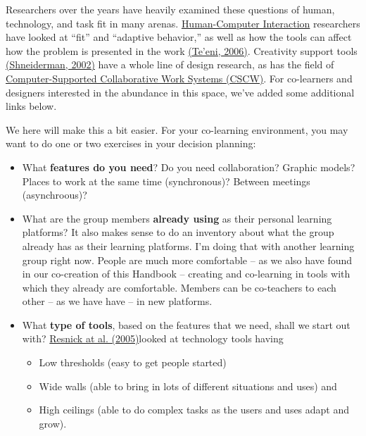 Researchers over the years have heavily examined these questions of
human, technology, and task fit in many arenas.
\href{http://en.wikipedia.org/wiki/Human-Computer\_Interaction}{Human-Computer
Interaction} researchers have looked at ``fit'' and ``adaptive
behavior,'' as well as how the tools can affect how the problem is
presented in the work \hyperref[teeni]{(Te'eni, 2006)}. Creativity
support tools \hyperref[shneiderman]{(Shneiderman, 2002)} have a whole
line of design research, as has the field of
\href{http://en.wikipedia.org/wiki/Computer-supported\_cooperative\_work}{Computer-Supported
Collaborative Work Systems (CSCW)}. For co-learners and designers
interested in the abundance in this space, we've added some additional
links below.

We here will make this a bit easier. For your co-learning environment,
you may want to do one or two exercises in your decision planning:

\begin{itemize}
\item
  What \textbf{features do you need}? Do you need collaboration? Graphic
  models? Places to work at the same time (synchronous)? Between
  meetings (asynchroous)?
\item
  What are the group members \textbf{already using} as their personal
  learning platforms? It also makes sense to do an inventory about what
  the group already has as their learning platforms. I'm doing that with
  another learning group right now. People are much more comfortable --
  as we also have found in our co-creation of this Handbook -- creating
  and co-learning in tools with which they already are comfortable.
  Members can be co-teachers to each other -- as we have have -- in new
  platforms.
\item
  What \textbf{type of tools}, based on the features that we need, shall
  we start out with? \hyperref[resnick]{Resnick at al. (2005)}looked at
  technology tools having

  \begin{itemize}
  \item
    Low thresholds (easy to get people started)
  \item
    Wide walls (able to bring in lots of different situations and uses)
    and
  \item
    High ceilings (able to do complex tasks as the users and uses adapt
    and grow).
  \end{itemize}
\end{itemize}

